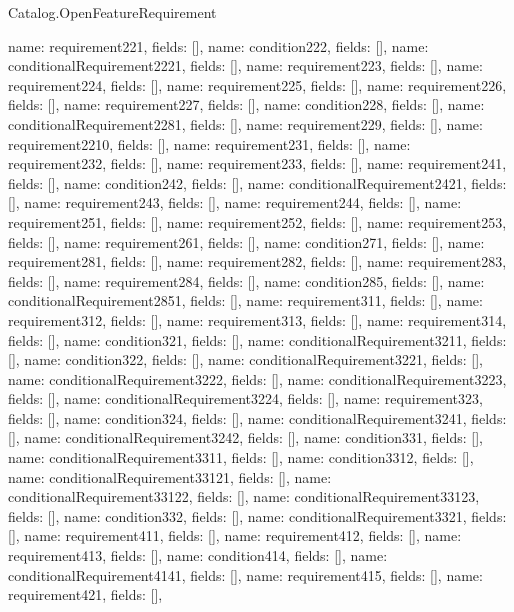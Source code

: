 \begin{lexlean}{Catalog.OpenFeatureRequirement}
\begin{semanticmodule}
{    {name: requirement221, fields: []},
    {name: condition222, fields: []},
    {name: conditionalRequirement2221, fields: []},
    {name: requirement223, fields: []},
    {name: requirement224, fields: []},
    {name: requirement225, fields: []},
    {name: requirement226, fields: []},
    {name: requirement227, fields: []},
    {name: condition228, fields: []},
    {name: conditionalRequirement2281, fields: []},
    {name: requirement229, fields: []},
    {name: requirement2210, fields: []},
    {name: requirement231, fields: []},
    {name: requirement232, fields: []},
    {name: requirement233, fields: []},
    {name: requirement241, fields: []},
    {name: condition242, fields: []},
    {name: conditionalRequirement2421, fields: []},
    {name: requirement243, fields: []},
    {name: requirement244, fields: []},
    {name: requirement251, fields: []},
    {name: requirement252, fields: []},
    {name: requirement253, fields: []},
    {name: requirement261, fields: []},
    {name: condition271, fields: []},
    {name: requirement281, fields: []},
    {name: requirement282, fields: []},
    {name: requirement283, fields: []},
    {name: requirement284, fields: []},
    {name: condition285, fields: []},
    {name: conditionalRequirement2851, fields: []},
    {name: requirement311, fields: []},
    {name: requirement312, fields: []},
    {name: requirement313, fields: []},
    {name: requirement314, fields: []},
    {name: condition321, fields: []},
    {name: conditionalRequirement3211, fields: []},
    {name: condition322, fields: []},
    {name: conditionalRequirement3221, fields: []},
    {name: conditionalRequirement3222, fields: []},
    {name: conditionalRequirement3223, fields: []},
    {name: conditionalRequirement3224, fields: []},
    {name: requirement323, fields: []},
    {name: condition324, fields: []},
    {name: conditionalRequirement3241, fields: []},
    {name: conditionalRequirement3242, fields: []},
    {name: condition331, fields: []},
    {name: conditionalRequirement3311, fields: []},
    {name: condition3312, fields: []},
    {name: conditionalRequirement33121, fields: []},
    {name: conditionalRequirement33122, fields: []},
    {name: conditionalRequirement33123, fields: []},
    {name: condition332, fields: []},
    {name: conditionalRequirement3321, fields: []},
    {name: requirement411, fields: []},
    {name: requirement412, fields: []},
    {name: requirement413, fields: []},
    {name: condition414, fields: []},
    {name: conditionalRequirement4141, fields: []},
    {name: requirement415, fields: []},
    {name: requirement421, fields: []},
}
\end{semanticmodule}
\end{lexlean}
